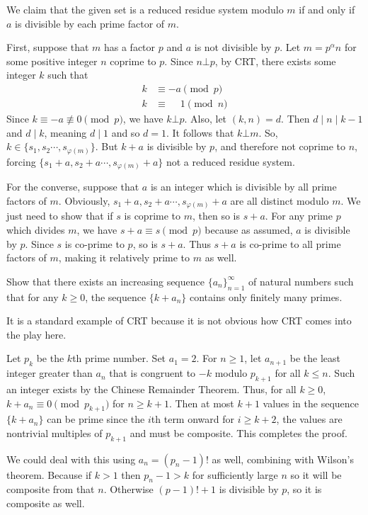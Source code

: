 \documentclass{subfile}
\begin{document}
		\begin{solution}
			We claim that the given set is a reduced residue system modulo $m$ if and only if $a$ is divisible by each prime factor of $m$.

			First, suppose that $m$ has a factor $p$ and $a$ is not divisible by $p$. Let $m=p^{\alpha}n$ for some positive integer $n$ coprime to $p$. Since $n \bot p$, by CRT, there exists some integer $k$ such that
				\begin{align*}
					k &\equiv -a \pmod p\\
					k &\equiv \phantom{-}1  \pmod n
				\end{align*}
			Since $k \equiv -a \not \equiv 0 \pmod p$, we have $k \bot p$. Also, let $(k,n)=d$. Then $d\mid n\mid k-1$ and $d\mid k$, meaning $d\mid 1$ and so $d=1$. It follows that $k \bot m$. So, $k \in \{s_1,s_2\cdots , s_{\varphi(m)}\} $. But $k+a$ is divisible by $p$, and therefore not coprime to $n$, forcing $ \{s_1+a,s_2+a\cdots , s_{\varphi(m)}+a\} $ not a reduced residue system.

			For the converse, suppose that $a$ is an integer which is divisible by all prime factors of $m$. Obviously, $s_1+a,s_2+a\cdots , s_{\varphi(m)}+a$ are all distinct modulo $m$. We just need to show that if $s$ is coprime to $m$, then so is $s+a$. For any prime $p$ which divides $m$, we have $s+a \equiv s \pmod p$ because as assumed, $a$ is divisible by $p$. Since $s$ is co-prime to $p$, so is $s+a$. Thus $s+a$ is co-prime to all prime factors of $m$, making it relatively prime to $m$ as well.
		\end{solution}

		\begin{problem}
			Show that there exists an increasing sequence $\{a_{n}\}_{n=1}^{\infty}$ of natural numbers such that for any $k \geq  0$, the sequence $\{k+a_{n}\}$ contains only finitely many primes.
		\end{problem}
	It is a standard example of CRT because it is not obvious how CRT comes into the play here.
		\begin{solution}
			Let $p_{k}$ be the $k$th prime number. Set ${a_1}= 2$. For	$n \geq  1$, let $a_{n+1}$ be the least integer greater than $a_{n}$ that is congruent to $-k$ modulo $p_{k+1}$ for all $k \leq  n$. Such an integer exists by the Chinese Remainder
			Theorem. Thus, for all $k \geq 0$, $k+a_{n}\equiv 0\pmod{p_{k+1}}$ for $n \geq  k + 1$. Then at most $k+1$ values in the sequence $\{k+a_{n}\}$ can be prime since the $i$th term onward for $i\geq k+2$, the values are nontrivial multiples of $p_{k+1}$ and must be composite. This completes the proof.
		\end{solution}

	\begin{note}
		We could deal with this using $a_n=(p_n-1)!$ as well, combining with Wilson's theorem. Because if $k>1$ then $p_n-1>k$ for sufficiently large $n$ so it will be composite from that $n$. Otherwise $(p-1)!+1$ is divisible by $p$, so it is composite as well.
	\end{note}
\end{document}
